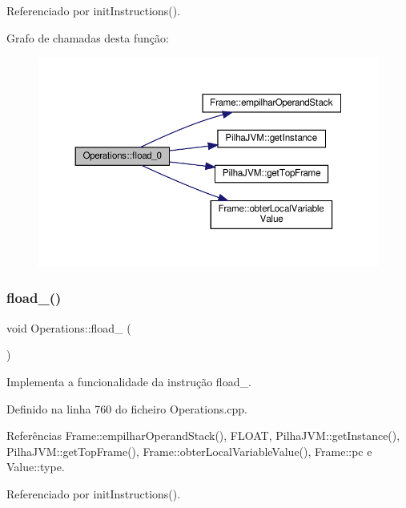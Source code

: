 Referenciado por init\+Instructions().

Grafo de chamadas desta função\+:
\nopagebreak
\begin{figure}[H]
\begin{center}
\leavevmode
\includegraphics[width=350pt]{classOperations_a844c8a8d812c4f78c8f1024bbdac0548_cgraph}
\end{center}
\end{figure}
\mbox{\label{classOperations_a71611bd9fa43e8e170a35f3a5e1f0572}} 
\subsubsection{\texorpdfstring{fload\+\_()}{fload\_1()}}
{\footnotesize\ttfamily void Operations\+::fload\+\_ (\begin{DoxyParamCaption}{ }\end{DoxyParamCaption})\hspace{0.3cm}{\ttfamily [private]}}



Implementa a funcionalidade da instrução fload\+\_. 



Definido na linha 760 do ficheiro Operations.\+cpp.



Referências Frame\+::empilhar\+Operand\+Stack(), F\+L\+O\+AT, Pilha\+J\+V\+M\+::get\+Instance(), Pilha\+J\+V\+M\+::get\+Top\+Frame(), Frame\+::obter\+Local\+Variable\+Value(), Frame\+::pc e Value\+::type.



Referenciado por init\+Instructions().

